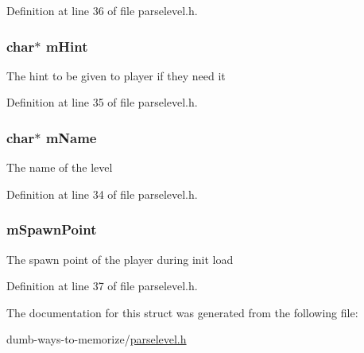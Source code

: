 Definition at line 36 of file parselevel.\+h.

\subsubsection[{\texorpdfstring{m\+Hint}{mHint}}]{\setlength{\rightskip}{0pt plus 5cm}char$\ast$ m\+Hint}\hypertarget{structlevel__s_a3353a10b7f238b4dc36fc1ccad58cd45}{}\label{structlevel__s_a3353a10b7f238b4dc36fc1ccad58cd45}
The hint to be given to player if they need it 

Definition at line 35 of file parselevel.\+h.

\subsubsection[{\texorpdfstring{m\+Name}{mName}}]{\setlength{\rightskip}{0pt plus 5cm}char$\ast$ m\+Name}\hypertarget{structlevel__s_ad5201d7f075979ee60c684961d6a4ead}{}\label{structlevel__s_ad5201d7f075979ee60c684961d6a4ead}
The name of the level 

Definition at line 34 of file parselevel.\+h.

\subsubsection[{\texorpdfstring{m\+Spawn\+Point}{mSpawnPoint}}]{ m\+Spawn\+Point}\hypertarget{structlevel__s_aa7fb9f569bb3df8b37853ebc7e67b11c}{}\label{structlevel__s_aa7fb9f569bb3df8b37853ebc7e67b11c}
The spawn point of the player during init load 

Definition at line 37 of file parselevel.\+h.



The documentation for this struct was generated from the following file\+:\begin{DoxyCompactItemize}
\item 
dumb-\/ways-\/to-\/memorize/\hyperlink{parselevel_8h}{parselevel.\+h}\end{DoxyCompactItemize}
